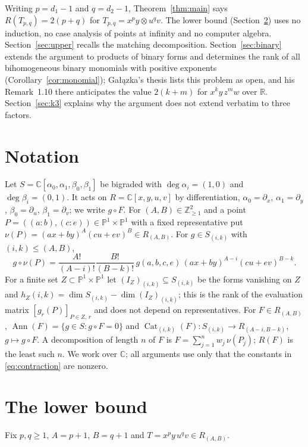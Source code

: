 \documentclass[11pt]{amsart}
\theoremstyle{remark}
\newcommand{\C}{\mathbb{C}}
\newcommand{\PP}{\mathbb{P}}
\DeclareMathOperator{\Ann}{Ann}
\DeclareMathOperator{\Cat}{Cat}
\begin{document}
Writing $p=d_1-1$ and $q=d_2-1$, Theorem~\ref{thm:main} says $R(T_{p,q})=2(p+q)$ for $T_{p,q}=x^py\otimes u^qv$. The lower bound (Section~\ref{sec:lower}) uses no induction, no case analysis of points at infinity and no computer algebra. Section~\ref{sec:upper} recalls the matching decomposition. Section~\ref{sec:binary} extends the argument to products of binary forms and determines the rank of all bihomogeneous binary monomials with positive exponents (Corollary~\ref{cor:monomial}); Ga{\l}\k{a}zka's thesis \cite[Rem.~1.8]{GalThesis} lists this problem as open, and his Remark~1.10 there anticipates the value $2(k+m)$ for $x^ky\,z^mw$ over $\mathbb R$. Section~\ref{sec:k3} explains why the argument does not extend verbatim to three factors.

\section{Notation}

Let $S=\C[\alpha_0,\alpha_1,\beta_0,\beta_1]$ be bigraded with $\deg\alpha_i=(1,0)$ and $\deg\beta_i=(0,1)$. It acts on $R=\C[x,y,u,v]$ by differentiation, $\alpha_0=\partial_x$, $\alpha_1=\partial_y$, $\beta_0=\partial_u$, $\beta_1=\partial_v$; we write $g\circ F$. For $(A,B)\in\mathbb Z_{\ge1}^2$ and a point $P=((a:b),(c:e))\in\PP^1\times\PP^1$ with a fixed representative put $\nu(P)=(ax+by)^A(cu+ev)^B\in R_{(A,B)}$. For $g\in S_{(i,k)}$ with $(i,k)\le(A,B)$,
\begin{equation}\label{eq:contraction}
g\circ\nu(P)=\frac{A!}{(A-i)!}\frac{B!}{(B-k)!}\,g(a,b,c,e)\,(ax+by)^{A-i}(cu+ev)^{B-k}.
\end{equation}
For a finite set $Z\subset\PP^1\times\PP^1$ let $(I_Z)_{(i,k)}\subseteq S_{(i,k)}$ be the forms vanishing on $Z$ and $h_Z(i,k)=\dim S_{(i,k)}-\dim(I_Z)_{(i,k)}$; this is the rank of the evaluation matrix $[g_r(P)]_{P\in Z,\,r}$ and does not depend on representatives. For $F\in R_{(A,B)}$, $\Ann(F)=\{g\in S: g\circ F=0\}$ and $\Cat_{(i,k)}(F)\colon S_{(i,k)}\to R_{(A-i,B-k)}$, $g\mapsto g\circ F$. A decomposition of length $n$ of $F$ is $F=\sum_{j=1}^n w_j\,\nu(P_j)$; $R(F)$ is the least such $n$. We work over $\C$; all arguments use only that the constants in \eqref{eq:contraction} are nonzero.

\section{The lower bound}\label{sec:lower}

Fix $p,q\ge1$, $A=p+1$, $B=q+1$ and $T=x^py\,u^qv\in R_{(A,B)}$.
\end{document}
